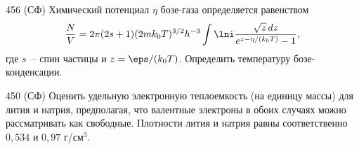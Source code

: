 \documentclass[pscyr]{hedwork}
\begin{document}
  \begin{task}{456 (СФ)}{
    Химический потенциал \( \eta \) бозе-газа определяется равенством
    \[
      \frac{N}{V} = 2\pi(2s + 1)(2mk_0 T)^{3/2} h^{-3}
        \int\lni \frac{\sqrt{z}\,dz}{e^{z - \eta / (k_0 T)} - 1},
    \]
    где \( s \)~-- спин частицы и \( z = \eps / (k_0 T) \). Определить
    температуру бозе-конденсации.
  }

  \end{task}

  \begin{task*}{450 (СФ)}{
    Оценить удельную электронную теплоемкость (на единицу массы) для лития и
    натрия, предполагая, что валентные электроны в обоих случаях можно
    рассматривать как свободные. Плотности лития и натрия равны соответственно
    \( 0,\!534 \) и \( 0,\!97 \) г/см\( ^3 \).
  }

  \end{task*}
\end{document}
